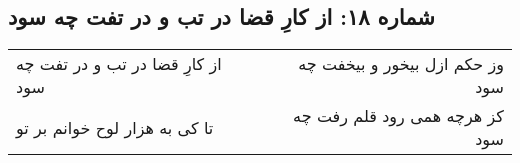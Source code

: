 \begin{center}
\section*{شماره ۱۸: از کارِ قضا در تب و در تفت چه سود}
\label{sec:018}
\begin{longtable}{l p{0.5cm} r}
از کارِ قضا در تب و در تفت چه سود
&&
وز حکم ازل بیخور و بیخفت چه سود
\\
تا کی به هزار لوح خوانم بر تو
&&
کز هرچه همی رود قلم رفت چه سود
\\
\end{longtable}
\end{center}
